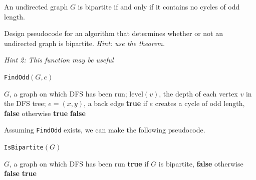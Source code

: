 \begin{theorem}\label{thm:bipartite}
An undirected graph \(G\) is bipartite if and only if it contains no cycles of odd length.
\end{theorem}
\begin{Exercise}[title={Algorithm for Determining Bipartite}, label={ex:proofs_bipartite}]
Design pseudocode for an algorithm that determines whether or not an undirected graph is bipartite. 
\textit{Hint: use the theorem.}

\textit{Hint 2: This function may be useful}

\texttt{FindOdd$(G, e)$}
\begin{algorithmic}[1]
\Require $G$, a graph on which DFS has been run; $\text{level}(v)$, the depth of each vertex $v$ in the DFS tree; $e = (x,y)$, a back edge
\Ensure \textbf{true} if $e$ creates a cycle of odd length, \textbf{false} otherwise
    \State \Return \textbf{true}
\Else
    \State \Return \textbf{false}
\EndIf
\end{algorithmic}
\end{Exercise}
\begin{Answer}[ref={ex:proofs_bipartite}]
Assuming \texttt{FindOdd} exists, we can make the following pseudocode.


\texttt{IsBipartite$(G)$}
\begin{algorithmic}[1]
\Require $G$, a graph on which DFS has been run
\Ensure \textbf{true} if $G$ is bipartite, \textbf{false} otherwise
        \State \Return \textbf{false}
    \EndIf
\EndFor
\State \Return \textbf{true}
\end{algorithmic}
\end{Answer}

